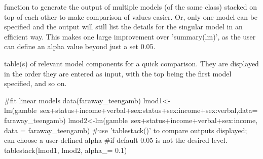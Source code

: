 \documentclass[a4paper]{book}
\begin{document}
%
\begin{Details}
function to generate the output of multiple models (of the same class) stacked on top of each other to make comparison of values easier. Or, only one model can be specified and the output
will still list the details for the singular model in an efficient way. This makes one large improvement over 'summary(lm)', as the user can define an alpha value beyond just a set 0.05.
\end{Details}
%
\begin{Value}
table(s) of relevant model components for a quick comparison. They are displayed in the order they are entered as input, with the top being the first model specified, and so on.
\end{Value}
%
\begin{Examples}
\begin{ExampleCode}
#fit linear models
data(faraway_teengamb)
lmod1<-lm(gamble~sex+status+income+verbal+sex:status+sex:income+sex:verbal,data=faraway_teengamb)
lmod2<-lm(gamble~sex+status+income+verbal+sex:income, data = faraway_teengamb)
#use 'tablestack()' to compare outputs displayed; can choose a user-defined alpha
#if default 0.05 is not the desired level.
 tablestack(lmod1, lmod2, alpha_= 0.1)

\end{ExampleCode}
\end{Examples}
\printindex{}
\end{document}
